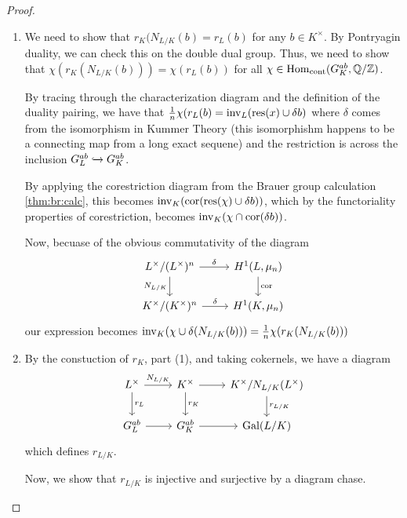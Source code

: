 \begin{proof}
	\begin{enumerate}[(1)]
		\item We need to show that \(r_{K}(N_{L / K}(b) = r_{L}(b)\) 
			for any \(b \in K^{\times}\).
			By Pontryagin duality, we can check this on the
			double dual group.
			Thus, we need to show that
			\(\chi(r_{K}(N_{L / K}(b))) = \chi(r_{L}(b))\) 
			for all \(\chi \in \operatorname{Hom}_{\text{cont}} (G_{K}^{ab},
			\mathbb{Q} / \mathbb{Z})\).

			By tracing through the characterization diagram
			and the definition of the duality pairing, 
			we have that
			\(\frac{1}{n}\chi(r_{L}(b) = 
			\operatorname{inv}_{L}( \operatorname{res}(x) \cup \delta b)\)
			where \(\delta\) comes from the isomorphism 
			in Kummer Theory (this isomorphishm happens
			to be a connecting map from a long exact sequene)
			and the restriction is across the inclusion 
			\(G_{L}^{ab} \xhookrightarrow{} G_{K}^{ab}\). 

			By applying the corestriction diagram 
			from the Brauer group
			calculation \ref{thm:br:calc}, 
			this becomes 
			\(\operatorname{inv}_{K}(\operatorname{cor}(\operatorname{res}(\chi) \cup \delta b))\), 
			which by the functoriality properties
			of corestriction, becomes
			\(\operatorname{inv}_{K} (\chi \cap \operatorname{cor}(\delta b)) \). 

			Now, becuase of the obvious commutativity of the
			diagram 
			\[
			\begin{tikzcd}
				L^{\times} / (L^{\times})^{n} \arrow{r}{\delta} 
				\arrow{d}[swap]{N_{L / K}} &
				H^{1}(L, \mu_{n}) \arrow{d}{\cor} \\
				K^{\times} / (K^{\times})^{n} \arrow{r}{\delta} &
				H^{1}(K, \mu_{n})
			\end{tikzcd}
			\]
			our expression becomes 
			\(\operatorname{inv}_{K}(\chi \cup \delta(N_{L / K}(b)))
			= \frac{1}{n} \chi(r_{K}(N_{L / K}(b)))\) 

		\item 
			By the constuction of \(r_{K}\), part (1), 
			and taking cokernels, we have a diagram
			\[
			\begin{tikzcd}
			L^{\times} \arrow{r}{N_{L / K}} \arrow{d}{r_{L}} &
			K^{\times} \arrow{r}{} \arrow{d}{r_{K}} &
			K^{\times} / N_{L / K} (L^{\times}) \arrow{d}{r_{L / K}} \\
			\absgal{L}^{ab} \arrow{r}{} &
			\gk^{ab} \arrow{r}{} &
			\Gal(L / K)
			\end{tikzcd}
			\]
			which defines \(r_{L / K}\). 

			Now, we show that \(r_{L / K}\) is injective and 
			surjective by a diagram chase.


\end{enumerate}
\end{proof}
